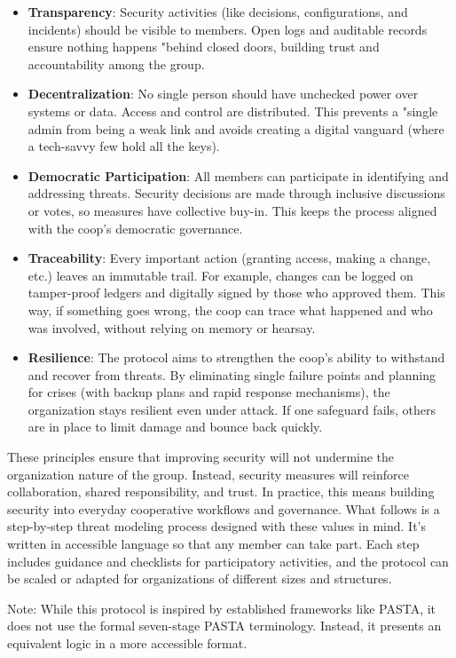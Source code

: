 \begin{itemize}
    \item \textbf{Transparency}: Security activities (like decisions,
configurations, and incidents) should be visible to members. Open logs and
auditable records ensure nothing happens "behind closed doors, building trust
and accountability among the group.
    \item \textbf{Decentralization}: No single person should have unchecked
power over systems or data. Access and control are distributed. This prevents a
"single admin from being a weak link and avoids creating a digital vanguard
(where a tech-savvy few hold all the keys).
    \item \textbf{Democratic Participation}: All members can participate in
identifying and addressing threats. Security decisions are made through
inclusive discussions or votes, so measures have collective buy-in. This keeps
the process aligned with the coop's democratic governance.
    \item \textbf{Traceability}: Every important action (granting access, making
a change, etc.) leaves an immutable trail. For example, changes can be logged on
tamper-proof ledgers and digitally signed by those who approved them. This way,
if something goes wrong, the coop can trace what happened and who was involved,
without relying on memory or hearsay.
    \item \textbf{Resilience}: The protocol aims to strengthen the coop's
ability to withstand and recover from threats. By eliminating single failure
points and planning for crises (with backup plans and rapid response
mechanisms), the organization stays resilient even under attack. If one
safeguard fails, others are in place to limit damage and bounce back quickly.
\end{itemize}

These principles ensure that improving security will not undermine the
organization nature of the group. Instead, security measures will reinforce
collaboration, shared responsibility, and trust. In practice, this means
building security into everyday cooperative workflows and governance. What
follows is a step-by-step threat modeling process designed with these values in
mind. It's written in accessible language so that any member can take part.
Each step includes guidance and checklists for participatory activities,
and the protocol can be scaled or adapted for organizations of different
sizes and structures.

Note: While this protocol is inspired by established frameworks like PASTA,
it does not use the formal seven-stage PASTA terminology. Instead, it
presents an equivalent logic in a more accessible format.

